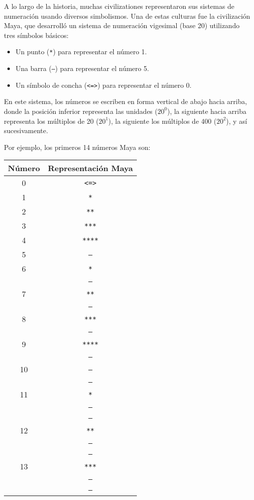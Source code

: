 
A lo largo de la historia, muchas civilizationes representaron sus sistemas de numeraci\'on usando diversos simbolismos. Una de estas culturas fue la civilización Maya, que desarrolló un sistema de numeración vigesimal (base 20) utilizando tres símbolos básicos:

\begin{itemize}
    \item Un punto (\texttt{*}) para representar el número 1.
    \item Una barra (\texttt{---}) para representar el número 5.
    \item Un símbolo de concha (\texttt{<=>}) para representar el número 0.
\end{itemize}

En este sistema, los números se escriben en forma vertical de abajo hacia arriba, donde la posición inferior representa las unidades ($20^0$), la siguiente hacia arriba representa los múltiplos de 20 ($20^1$), la siguiente los múltiplos de 400 ($20^2$), y así sucesivamente.

Por ejemplo, los primeros 14 n\'umeros Maya son:

\begin{tabular}{|c|c|}
\hline
\textbf{Número} & \textbf{Representación Maya} \\
\hline
0 & \texttt{<=>} \\
\hline
1 & \texttt{*} \\
\hline
2 & \texttt{**} \\
\hline
3 & \texttt{***} \\
\hline
4 & \texttt{****} \\
\hline
5 & \texttt{---} \\
\hline
6 & \texttt{*} \\
  & \texttt{---} \\
\hline
7 & \texttt{**} \\
  & \texttt{---} \\
\hline
8 & \texttt{***} \\
  & \texttt{---} \\
\hline
9 & \texttt{****} \\
  & \texttt{---} \\
\hline
10 & \texttt{---} \\
   & \texttt{---} \\
\hline
11 & \texttt{*} \\
   & \texttt{---} \\
   & \texttt{---} \\
\hline
12 & \texttt{**} \\
   & \texttt{---} \\
   & \texttt{---} \\
\hline
13 & \texttt{***} \\
   & \texttt{---} \\
   & \texttt{---} \\
\hline
\end{tabular}

